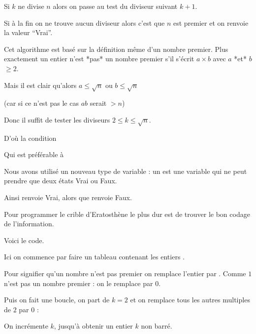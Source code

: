 Si $k$ ne divise $n$ alors on passe au test du diviseur suivant $k+1$.

\change

Si à la fin on ne trouve aucun diviseur alors c'est que $n$ est premier et on renvoie la valeur ``Vrai''.


\change

Cet algorithme est basé sur la définition même d'un nombre premier.
Plus exactement un entier n'est *pas* un nombre premier s'il s'écrit $a\times b$
avec $a$ *et* $b$ $\ge 2$.

\change

Mais il est clair qu'alors $a \le \sqrt n$ ou $b \le \sqrt n$ 

(car si ce n'est pas le cas $ab$ serait $> n$)



\change

Donc il suffit de tester les diviseurs $2 \le k \le \sqrt n$.

\change

D'où la condition 

\change

Qui est préférable à   

\change


Nous avons utilisé un nouveau type de variable : un  est une variable qui ne peut prendre que deux
états Vrai ou Faux. 

Ainsi  renvoie Vrai, 
alors que  renvoie Faux.



\diapo

Pour programmer le crible d'Eratosthène le plus dur est de trouver le bon codage de l'information.

Voici le code.


Ici on commence par faire un tableau contenant les entiers \codeinline{[0,1,2,3,4,5,6,7,8,9,10,11,12,13,...]}. 


\change

Pour signifier qu'un nombre n'est pas premier on remplace l'entier par .
Comme $1$ n'est pas un nombre premier : on le remplace par $0$.

\change

Puis on fait une boucle, on part de $k=2$ et on remplace tous les autres multiples de $2$ par $0$ :

On incrémente $k$, jusqu'à obtenir un entier $k$ non barré. 


